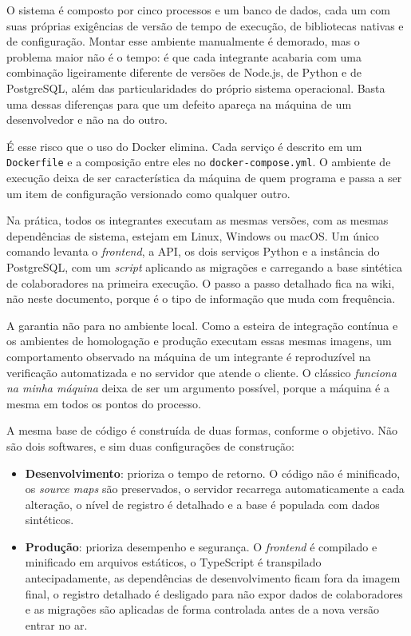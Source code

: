 \documentclass[a4paper,12pt,oneside,openany]{book}
\begin{document}
O sistema é composto por cinco processos e um banco de dados, cada um com suas
próprias exigências de versão de tempo de execução, de bibliotecas nativas e de
configuração. Montar esse ambiente manualmente é demorado, mas o problema maior
não é o tempo: é que cada integrante acabaria com uma combinação ligeiramente
diferente de versões de Node.js, de Python e de PostgreSQL, além das
particularidades do próprio sistema operacional. Basta uma dessas diferenças
para que um defeito apareça na máquina de um desenvolvedor e não na do outro.

É esse risco que o uso do Docker elimina. Cada serviço é descrito em um
\texttt{Dockerfile} e a composição entre eles no \texttt{docker-compose.yml}.
O ambiente de execução deixa de ser característica da máquina de quem programa
e passa a ser um item de configuração versionado como qualquer outro.

Na prática, todos os integrantes executam as mesmas versões, com as mesmas
dependências de sistema, estejam em Linux, Windows ou macOS. Um único comando
levanta o \textit{frontend}, a API, os dois serviços Python e a instância do
PostgreSQL, com um \textit{script} aplicando as migrações e carregando a base
sintética de colaboradores na primeira execução. O passo a passo detalhado fica
na wiki, não neste documento, porque é o tipo de informação que muda com
frequência.

A garantia não para no ambiente local. Como a esteira de integração contínua e
os ambientes de homologação e produção executam essas mesmas imagens, um
comportamento observado na máquina de um integrante é reproduzível na
verificação automatizada e no servidor que atende o cliente. O clássico
\textit{funciona na minha máquina} deixa de ser um argumento possível, porque a
máquina é a mesma em todos os pontos do processo.

A mesma base de código é construída de duas formas, conforme o objetivo. Não
são dois softwares, e sim duas configurações de construção:

\begin{itemize}[nosep]
    \item \textbf{Desenvolvimento}: prioriza o tempo de retorno. O código
    não é minificado, os \textit{source maps} são preservados, o servidor
    recarrega automaticamente a cada alteração, o nível de registro é detalhado
    e a base é populada com dados sintéticos.
    \item \textbf{Produção}: prioriza desempenho e segurança. O
    \textit{frontend} é compilado e minificado em arquivos estáticos, o
    TypeScript é transpilado antecipadamente, as dependências de
    desenvolvimento ficam fora da imagem final, o registro detalhado é
    desligado para não expor dados de colaboradores e as migrações são
    aplicadas de forma controlada antes de a nova versão entrar no ar.
\end{itemize}
\end{document}
